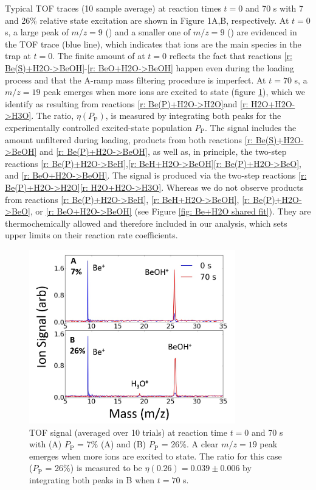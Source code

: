 Typical TOF traces (10 sample average) at reaction times $t=0$ and 70 s with 7 and 26\% relative  state excitation are shown in Figure 1A,B, respectively. At $t=0$ s, a large peak of $m/z=9$ () and a smaller one of $m/z=9$ () are evidenced in the TOF trace (blue line), which indicates that  ions are the main species in the trap at $t=0$. The finite amount of  at $t=0$ reflects the fact that reactions \ref{r: Be(S)+H2O->BeOH}-\ref{r: BeO+H2O->BeOH} happen even during the loading process and that the A-ramp mass filtering procedure is imperfect. At $t=70$ s, a $m/z=19$ peak emerges when more  ions are excited to  state (figure \ref{fig: Be+H2O TOF}), which we identify as  resulting from reactions \ref{r: Be(P)+H2O->H2O}and \ref{r: H2O+H2O->H3O}. The  ratio, $\eta(P_\text{P})$, is measured by integrating both peaks for the experimentally controlled excited-state population $P_\text{P}$. The  signal includes the amount unfiltered during loading, products from both reactions \ref{r: Be(S)+H2O->BeOH} and \ref{r: Be(P)+H2O->BeOH}, as well as, in principle, the two-step reactions \ref{r: Be(P)+H2O->BeH},\ref{r: BeH+H2O->BeOH}\ref{r: Be(P)+H2O->BeO}, and \ref{r: BeO+H2O->BeOH}. The  signal is produced via the two-step reactions \ref{r: Be(P)+H2O->H2O}\ref{r: H2O+H2O->H3O}. Whereas we do not observe products from reactions \ref{r: Be(P)+H2O->BeH}, \ref{r: BeH+H2O->BeOH}, \ref{r: Be(P)+H2O->BeO}, or \ref{r: BeO+H2O->BeOH} (see Figure \ref{fig: Be+H2O shared fit}). They are thermochemically allowed and therefore included in our analysis, which sets upper limits on their reaction rate coefficients.

\begin{figure}
	\centering
	\includegraphics[width=0.8\textwidth]{images/Be_H2O_TOF.png}
	\caption{TOF signal (averaged over 10 trials) at reaction time $t = 0$ and 70 s with (A) $P_{\text{P}}$ = 7\% (A) and (B) $P_{\text{P}}$ = 26\%. A clear $m/z = 19$ peak emerges when more  ions are excited to  state. The  ratio for this case ($P_{\text{P}}$ = 26\%) is measured to be $\eta(0.26) = 0.039 \pm 0.006$ by integrating both peaks in B when $t = 70$ s.}
	\label{fig: Be+H2O TOF}
\end{figure}

